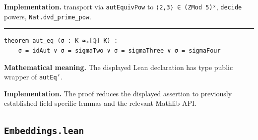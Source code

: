 \documentclass[UTF8,a4paper,11pt,fontset=fandol]{ctexart}
\theoremstyle{definition}
\newcommand{\statementsep}{\par\medskip\hrule\medskip}
\begin{document}
\noindent\textbf{Implementation.} transport via \texttt{autEquivPow} to \texttt{⟨2,3⟩ ∈ (ZMod 5)ˣ}, \texttt{decide} powers, \texttt{Nat.\allowbreak{}dvd\_\allowbreak{}prime\_\allowbreak{}pow}.\par
\statementsep
\begin{verbatim}
theorem aut_eq (σ : K ≃ₐ[ℚ] K) :
    σ = idAut ∨ σ = sigmaTwo ∨ σ = sigmaThree ∨ σ = sigmaFour
\end{verbatim}
\noindent\textbf{Mathematical meaning.} The displayed Lean declaration has type public wrapper of \texttt{autEq'}.\par
\noindent\textbf{Implementation.} The proof reduces the displayed assertion to previously established field-specific lemmas and the relevant Mathlib API.\par

\subsection{\texttt{Embeddings.lean}}
\end{document}
